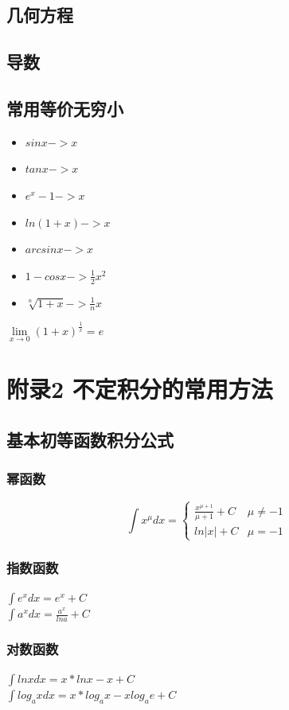 \documentclass[fleqn]{article}
\begin{document}
\begin{flushleft}
\begin{itemize}
\end{itemize}
\subsection{几何方程}
\subsection{导数}
\subsection{常用等价无穷小}
\begin{itemize}
	\item $sinx -> x$
	\item $tanx -> x$
	\item $e^x-1 -> x$
	\item $ln(1+x) -> x$
	\item $arcsinx -> x$
	\item $1-cosx -> \frac{1}{2}x^2$
	\item $\sqrt[n]{1+x} -> \frac{1}{n}x$
\end{itemize}

$\lim\limits_{x \to 0}{(1+x)^{\frac{1}{x}}}=e$

\newpage
\section{附录2  不定积分的常用方法} 
	\subsection{基本初等函数积分公式}
		\subsubsection{幂函数}
		\[
			\int x^\mu dx=
			\left \{
				\begin{array}{ll}
					\frac{x^{\mu+1}}{\mu + 1} + C & \mu \neq -1 \\
								 ln|x| + C & \mu =-1
				\end{array}
			\right. 
		\]
		\subsubsection{指数函数}
		$\int e^x dx=e^x+C$\\
		$\int a^x dx=\frac{a^x}{lna}+C$
		\subsubsection{对数函数}
		$\int lnx dx=x*lnx-x+C$\\
		$\int log_a x dx=x*log_a x -xlog_ae+C$

\end{flushleft}
\end{document}
